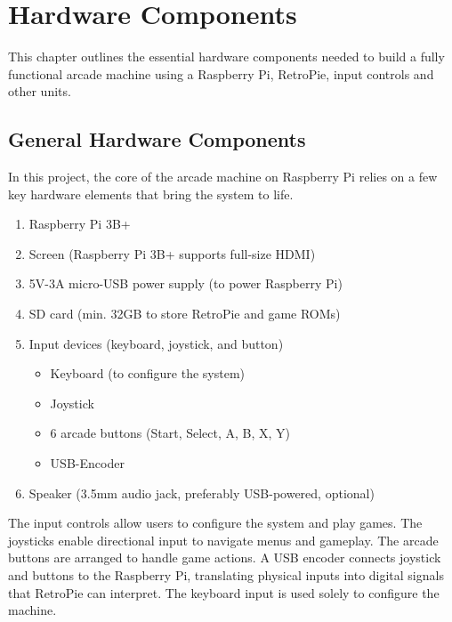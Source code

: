 \chapter{Hardware Components}
\label{cha:hardware_components}

This chapter outlines the essential hardware components needed to build a fully functional arcade machine using a Raspberry Pi, RetroPie, input controls and other units.

\section{General Hardware Components}
\label{sec:general_hardware_components}

In this project, the core of the arcade machine on Raspberry Pi relies on a few key hardware elements that bring the system to life.

\begin{enumerate}
  \item Raspberry Pi 3B+
  \item Screen (Raspberry Pi 3B+ supports full-size HDMI)
  \item 5V-3A micro-USB power supply (to power Raspberry Pi)
  \item SD card (min. 32GB to store RetroPie and game ROMs)
  \item Input devices (keyboard, joystick, and button)
    \begin{itemize}
      \item Keyboard (to configure the system)
      \item Joystick
      \item 6 arcade buttons (Start, Select, A, B, X, Y)
      \item USB-Encoder
    \end{itemize}
  \item Speaker (3.5mm audio jack, preferably USB-powered, optional)
\end{enumerate}

The input controls allow users to configure the system and play games. The joysticks enable directional input to navigate menus and gameplay. The arcade buttons are arranged to handle game actions. A USB encoder connects joystick and buttons to the Raspberry Pi, translating physical inputs into digital signals that RetroPie can interpret. The keyboard input is used solely to configure the machine.
